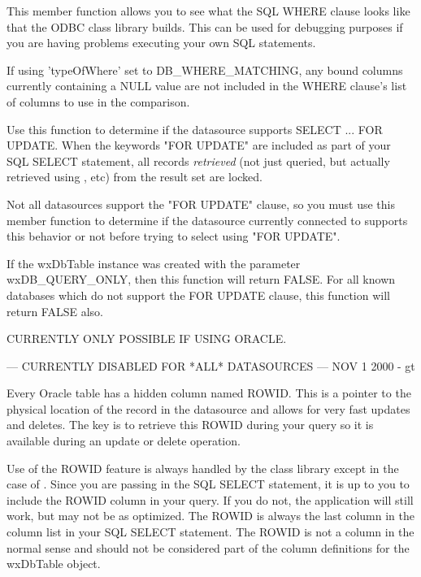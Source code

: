 
This member function allows you to see what the SQL WHERE clause looks like 
that the ODBC class library builds.  This can be used for debugging purposes
if you are having problems executing your own SQL statements.

If using 'typeOfWhere' set to DB_WHERE_MATCHING, any bound columns currently
containing a NULL value are not included in the WHERE clause's list of
columns to use in the comparison.


\label{wxdbtablecanselectforupdate}


Use this function to determine if the datasource supports SELECT ... FOR UPDATE.
When the keywords "FOR UPDATE" are included as part of your SQL SELECT statement,
all records {\it retrieved} (not just queried, but actually retrieved using 
, etc) from the result set are 
locked.  


Not all datasources support the "FOR UPDATE" clause, so you must use this
member function to determine if the datasource currently connected to supports
this behavior or not before trying to select using "FOR UPDATE".

If the wxDbTable instance was created with the parameter wxDB_QUERY_ONLY, then 
this function will return FALSE.  For all known databases which do not support 
the FOR UPDATE clause, this function will return FALSE also.


\label{wxdbtablecanupdatebyrowid}


CURRENTLY ONLY POSSIBLE IF USING ORACLE.  

--- CURRENTLY DISABLED FOR *ALL* DATASOURCES --- NOV 1 2000 - gt

Every Oracle table has a hidden column named ROWID.  This is a pointer to the
physical location of the record in the datasource and allows for very fast 
updates and deletes.  The key is to retrieve this ROWID during your query so
it is available during an update or delete operation. 

Use of the ROWID feature is always handled by the class library except in the 
case of .  Since 
you are passing in the SQL SELECT statement, 
it is up to you to include the ROWID column in your query.  If you do not, 
the application will still work, but may not be as optimized.  The ROWID is 
always the last column in the column list in your SQL SELECT statement.  
The ROWID is not a column in the normal sense and should not be considered 
part of the column definitions for the wxDbTable object.

